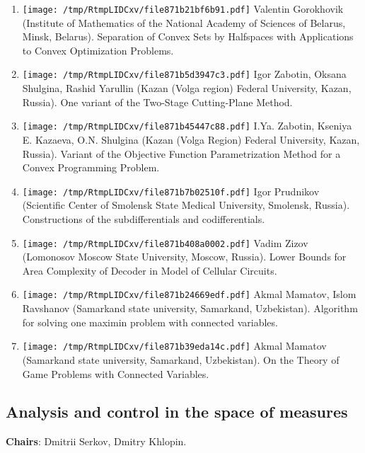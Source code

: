 \documentclass[
]{article}
\providecommand{\tightlist}{%
  \setlength{\itemsep}{0pt}\setlength{\parskip}{0pt}}
\begin{document}
\begin{enumerate}
\def\labelenumi{\arabic{enumi}.}
\tightlist
\item
  \protect\texttt{[image: /tmp/RtmpLIDCxv/file871b21bf6b91.pdf]}
  Valentin Gorokhovik (Institute of Mathematics of the National Academy
  of Sciences of Belarus, Minsk, Belarus). Separation of Convex Sets by
  Halfspaces with Applications to Convex Optimization Problems.
\item
  \protect\texttt{[image: /tmp/RtmpLIDCxv/file871b5d3947c3.pdf]}
  Igor Zabotin, Oksana Shulgina, Rashid Yarullin (Kazan (Volga region)
  Federal University, Kazan, Russia). One variant of the Two-Stage
  Cutting-Plane Method.
\item
  \protect\texttt{[image: /tmp/RtmpLIDCxv/file871b45447c88.pdf]}
  I.Ya. Zabotin, Kseniya E. Kazaeva, O.N. Shulgina (Kazan (Volga Region)
  Federal University, Kazan, Russia). Variant of the Objective Function
  Parametrization Method for a Convex Programming Problem.
\item
  \protect\texttt{[image: /tmp/RtmpLIDCxv/file871b7b02510f.pdf]}
  Igor Prudnikov (Scientific Center of Smolensk State Medical
  University, Smolensk, Russia). Constructions of the subdifferentials
  and codifferentials.
\item
  \protect\texttt{[image: /tmp/RtmpLIDCxv/file871b408a0002.pdf]}
  Vadim Zizov (Lomonosov Moscow State University, Moscow, Russia). Lower
  Bounds for Area Complexity of Decoder in Model of Cellular Circuits.
\item
  \protect\texttt{[image: /tmp/RtmpLIDCxv/file871b24669edf.pdf]}
  Akmal Mamatov, Islom Ravshanov (Samarkand state university, Samarkand,
  Uzbekistan). Algorithm for solving one maximin problem with connected
  variables.
\item
  \protect\texttt{[image: /tmp/RtmpLIDCxv/file871b39eda14c.pdf]}
  Akmal Mamatov (Samarkand state university, Samarkand, Uzbekistan). On
  the Theory of Game Problems with Connected Variables.
\end{enumerate}

\hypertarget{meas}{%
\subsection{Analysis and control in the space of measures}\label{meas}}

\textbf{Chairs}: Dmitrii Serkov, Dmitry Khlopin.
\end{document}
